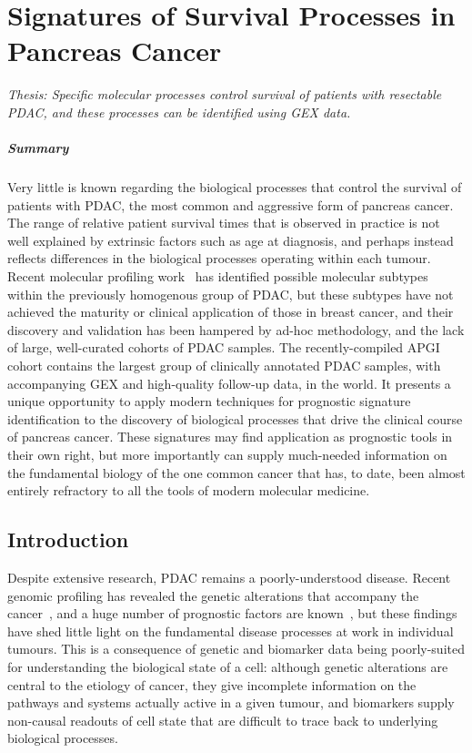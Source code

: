 \documentclass[dissertation.tex]{subfiles}
\begin{document}
\chapter[Signatures of Survival Processes in Pancreas Cancer][Survival Signatures]{Signatures of Survival Processes in Pancreas Cancer}
\label{chap:signatures}

\emph{Thesis: Specific molecular processes control survival of patients with resectable \acrlong{PDAC}, and these processes can be identified using \acrlong{GEX} data.}

\paragraph{Summary}Very little is known regarding the biological processes that control the survival of patients with \gls{PDAC}, the most common and aggressive form of pancreas cancer.  The range of relative patient survival times that is observed in practice is not well explained by extrinsic factors such as age at diagnosis, and perhaps instead reflects differences in the biological processes operating within each tumour.  Recent molecular profiling work~\cite{Collisson2011} has identified possible molecular subtypes within the previously homogenous group of \gls{PDAC}, but these subtypes have not achieved the maturity or clinical application of those in breast cancer, and their discovery and validation has been hampered by ad-hoc methodology, and the lack of large, well-curated cohorts of \gls{PDAC} samples.  The recently-compiled \gls{APGI} cohort contains the largest group of clinically annotated \gls{PDAC} samples, with accompanying \gls{GEX} and high-quality follow-up data, in the world.  It presents a unique opportunity to apply modern techniques for prognostic signature identification to the discovery of biological processes that drive the clinical course of pancreas cancer.  These signatures may find application as prognostic tools in their own right, but more importantly can supply much-needed information on the fundamental biology of the one common cancer that has, to date, been almost entirely refractory to all the tools of modern molecular medicine.

\section{Introduction}
Despite extensive research, \gls{PDAC} remains a poorly-understood disease.  Recent genomic profiling has revealed the genetic alterations that accompany the cancer~\cite{Biankin2012}, and a huge number of prognostic factors are known~\cite{Harsha2009}, but these findings have shed little light on the fundamental disease processes at work in individual tumours.  This is a consequence of genetic and biomarker data being poorly-suited for understanding the biological state of a cell: although genetic alterations are central to the etiology of cancer, they give incomplete information on the pathways and systems actually active in a given tumour, and biomarkers supply non-causal readouts of cell state that are difficult to trace back to underlying biological processes.
\end{document}
